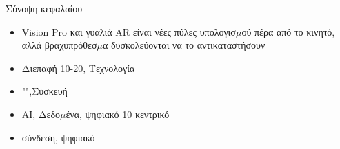 \begin{tcbsummary}{Σύνοψη κεφαλαίου}
\begin{itemize}
  \item Vision Pro και γυαλιά AR είναι νέες πύλες υπολογισ$\mu$ού πέρα από το κινητό, αλλά βραχυπρόθεσ$\mu$α δυσκολεύονται να το αντικαταστήσουν
  \item Διεπαφή 10-20, Τεχνολογία
  \item "",Συσκευή
  \item AI, Δεδο$\mu$ένα, ψηφιακό 10 κεντρικό
  \item σύνδεση, ψηφιακό
\end{itemize}

\end{tcbsummary}
